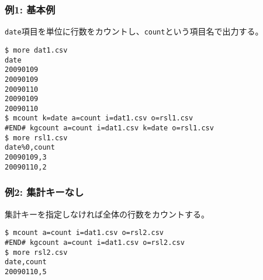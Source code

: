 \subsubsection*{例1: 基本例}

\verb|date|項目を単位に行数をカウントし、\verb|count|という項目名で出力する。


\begin{Verbatim}[baselinestretch=0.7,frame=single]
$ more dat1.csv
date
20090109
20090109
20090110
20090109
20090110
$ mcount k=date a=count i=dat1.csv o=rsl1.csv
#END# kgcount a=count i=dat1.csv k=date o=rsl1.csv
$ more rsl1.csv
date%0,count
20090109,3
20090110,2
\end{Verbatim}
\subsubsection*{例2: 集計キーなし}

集計キーを指定しなければ全体の行数をカウントする。


\begin{Verbatim}[baselinestretch=0.7,frame=single]
$ mcount a=count i=dat1.csv o=rsl2.csv
#END# kgcount a=count i=dat1.csv o=rsl2.csv
$ more rsl2.csv
date,count
20090110,5
\end{Verbatim}
